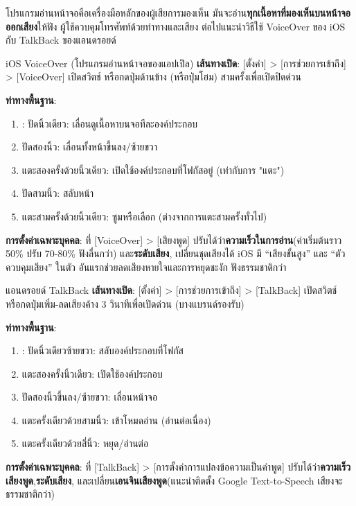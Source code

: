 
โปรแกรมอ่านหน้าจอคือเครื่องมือหลักของผู้เสียการมองเห็น มันจะอ่าน\textbf{ทุกเนื้อหาที่มองเห็นบนหน้าจอออกเสียง}ให้ฟัง ผู้ใช้ควบคุมโทรศัพท์ด้วยท่าทางและเสียง ต่อไปแนะนำวิธีใช้ VoiceOver ของ iOS กับ TalkBack ของแอนดรอยด์

\begin{tcbinfo}{iOS VoiceOver (โปรแกรมอ่านหน้าจอของแอปเปิล)}
\textbf{เส้นทางเปิด}: [ตั้งค่า] > [การช่วยการเข้าถึง] > [VoiceOver] เปิดสวิตช์ หรือกดปุ่มด้านข้าง (หรือปุ่มโฮม) สามครั้งเพื่อเปิดปิดด่วน

\textbf{ท่าทางพื้นฐาน}:

\begin{enumerate}
  \item : ปัดนิ้วเดียว: เลื่อนดูเนื้อหาบนจอทีละองค์ประกอบ
  \item ปัดสองนิ้ว: เลื่อนทั้งหน้าขึ้นลง/ซ้ายขวา
  \item แตะสองครั้งด้วยนิ้วเดียว: เปิดใช้องค์ประกอบที่โฟกัสอยู่ (เท่ากับการ "แตะ")
  \item ปัดสามนิ้ว: สลับหน้า
  \item แตะสามครั้งด้วยนิ้วเดียว: ซูมหรือเลือก (ต่างจากการแตะสามครั้งทั่วไป)
\end{enumerate}

\textbf{การตั้งค่าเฉพาะบุคคล}: ที่ [VoiceOver] > [เสียงพูด] ปรับได้ว่า\textbf{ความเร็วในการอ่าน}(ค่าเริ่มต้นราว 50\% ปรับ 70-80\% ฟังลื่นกว่า) และ\textbf{ระดับเสียง}, เปลี่ยนชุดเสียงได้ iOS มี “เสียงขั้นสูง” และ “ตัวควบคุมเสียง” ในตัว อันแรกช่วยลดเสียงหายใจและการหยุดชะงัก ฟังธรรมชาติกว่า

\end{tcbinfo}

\begin{tcbinfo}{แอนดรอยด์ TalkBack}
\textbf{เส้นทางเปิด}: [ตั้งค่า] > [การช่วยการเข้าถึง] > [TalkBack] เปิดสวิตช์ หรือกดปุ่มเพิ่ม-ลดเสียงค้าง 3 วินาทีเพื่อเปิดด่วน (บางแบรนด์รองรับ)

\textbf{ท่าทางพื้นฐาน}:

\begin{enumerate}
  \item : ปัดนิ้วเดียวซ้ายขวา: สลับองค์ประกอบที่โฟกัส
  \item แตะสองครั้งนิ้วเดียว: เปิดใช้องค์ประกอบ
  \item ปัดสองนิ้วขึ้นลง/ซ้ายขวา: เลื่อนหน้าจอ
  \item แตะครั้งเดียวด้วยสามนิ้ว: เข้าโหมดอ่าน (อ่านต่อเนื่อง)
  \item แตะครั้งเดียวด้วยสี่นิ้ว: หยุด/อ่านต่อ
\end{enumerate}

\textbf{การตั้งค่าเฉพาะบุคคล}: ที่ [TalkBack] > [การตั้งค่าการแปลงข้อความเป็นคำพูด] ปรับได้ว่า\textbf{ความเร็วเสียงพูด},\textbf{ระดับเสียง}, และเปลี่ยน\textbf{เอนจินเสียงพูด}(แนะนำติดตั้ง Google Text-to-Speech เสียงจะธรรมชาติกว่า)

\end{tcbinfo}

